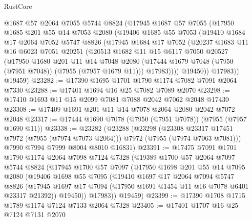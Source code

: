 \begin{lexlean}{RustCore}
\begin{coremodule}
      @1687
      @57
      @2064
      @7055
      @5744
      @8824
      (@17945
        @1687
        @57
        @7055
        (@17950
          @1685
          @201
          @55
          @14
          @7053
          @2080
          (@19406
            @1685
            @55
            @7053
            (@19410
              @1684
              @17
              @2064
              @7052
              @5747
              @8826
              (@17945
                @1684
                @17
                @7052
                (@20237
                  @1683
                  @11
                  @16
                  @6023
                  @7051
                  @20251
                  (@20513
                    @1682
                    @11
                    @15
                    @6117
                    @7050
                    @20527
                    (@17950
                      @1680
                      @201
                      @11
                      @14
                      @7048
                      @2080
                      (@17444 @1679 @7048 (@7950 (@7951 @7048)) (@7955 (@7957 @1679 @11)))
                      @17983))))
              @19450))
          @17983))
      @19459)
@23282 := @17390 @1695 @1701 @1790 @1174 @7082 @7091 @2064 @7330
@23288 := @17401 @1694 @16 @25 @7082 @7089 @2070
@23298 := @17410 @1693 @11 @15 @2099 @7081 @7088 @2042 @7062 @2048 @17430
@23308 := @17409 @1691 @201 @11 @14 @7078 @2064 @2080 @2042 @7072 @2048
@23317 := @17444 @1690 @7078 (@7950 (@7951 @7078)) (@7955 (@7957 @1690 @11))
@23338 := @23282
    (@23288
      (@23298
        (@23308 @23317 @17451 @7972 (@7955 (@7974 @7073 @2064)))
        @7972
        (@7955 (@7974 @7063 @7081)))
      @7990
      @7994
      @7999
      @8004
      @8010
      @16831)
@23391 := @17475
    @7091
    @1701
    @1790
    @1174
    @2064
    @7098
    @7124
    @7328
    (@19389
      @1700
      @57
      @2064
      @7097
      @5744
      @8824
      (@17945
        @1700
        @57
        @7097
        (@17950
          @1698
          @201
          @55
          @14
          @7095
          @2080
          (@19406
            @1698
            @55
            @7095
            (@19410
              @1697
              @17
              @2064
              @7094
              @5747
              @8826
              (@17945 @1697 @17 @7094 (@17950 @1691 @1454 @11 @16 @7078 @6401 @23317 @21392))
              @19450))
          @17983))
      @19459)
@23399 := @17390 @1708 @1715 @1789 @1174 @7124 @7133 @2064 @7328
@23405 := @17401 @1707 @16 @25 @7124 @7131 @2070

\end{coremodule}
\end{lexlean}
